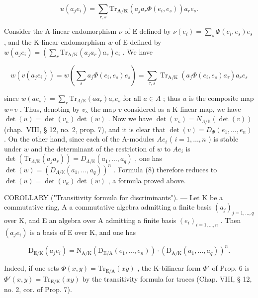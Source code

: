 \[
u (a _ {j} e _ {i}) = \sum_ {r, s} \mathrm{Tr} _ {\mathbf {A} / \mathbf {K}} (a _ {j} a _ {r} \Phi (e _ {i}, e _ {s})) a _ {r} e _ {s}.
\]

Consider the A-linear endomorphism \(\nu\) of E defined by \(\nu(e_i) = \sum_s \Phi(e_i, e_s)e_s\) , and the K-linear endomorphism \(w\) of E defined by \(w(a_j e_i) = (\sum_r \mathrm{Tr}_{\mathrm{A/K}}(a_j a_r)a_r)e_i\) . We have

\[
w \left(v \left(a _ {j} e _ {i}\right)\right) = w \left(\sum_ {s} a _ {j} \Phi \left(e _ {i}, e _ {s}\right) e _ {s}\right) = \sum_ {\tau , s} \operatorname{Tr} _ {\mathrm{A} / \mathrm{K}} \left(a _ {j} \Phi \left(e _ {i}, e _ {s}\right) a _ {\tau}\right) a _ {r} e _ {s}
\]

since \(w(ae_s) = \sum_r \mathrm{Tr}_{\Lambda/\mathbb{K}}(aa_r)a_r e_s\) for all \(a \in A\) ; thus \(u\) is the composite map \(w \circ v\) . Thus, denoting by \(v_{\kappa}\) the map \(v\) considered as a K-linear map, we have \(\det(u) = \det(v_{\kappa})\det(w)\) . Now we have \(\det(v_{\kappa}) = N_{\Lambda/\mathbb{K}}(\det(v))\) (chap.~VIII, § 12, no. 2, prop. 7), and it is clear that \(\det(v) = D_{\Phi}(e_1, \ldots, e_n)\) . On the other hand, since each of the A-modules \(Ae_i\) ( \(i = 1, \ldots, n\) ) is stable under \(w\) and the determinant of the restriction of \(w\) to \(Ae_i\) is \(\det(\mathrm{Tr}_{\Lambda/\mathbb{K}}(a_j a_r)) = D_{\Lambda/\mathbb{K}}(a_1, \ldots, a_q)\) , one has \(\det(w) = (D_{\Lambda/\mathbb{K}}(a_1, \ldots, a_q))^n\) . Formula (8) therefore reduces to \(\det(u) = \det(v_{\kappa})\det(w)\) , a formula proved above.

COROLLARY ("Transitivity formula for discriminants"). — Let K be a commutative ring, A a commutative algebra admitting a finite basis \((a_{j})_{j=1,\ldots,q}\) over K, and E an algebra over A admitting a finite basis \((e_{i})_{i=1,\ldots,n}\) . Then \((a_{j}e_{i})\) is a basis of E over K, and one has

\[
\mathrm{D} _ {\mathrm{E} / \mathrm{K}} (a _ {j} e _ {i}) = \mathrm{N} _ {\mathrm{A} / \mathrm{K}} (\mathrm{D} _ {\mathrm{E} / \mathrm{A}} (e _ {1}, \dots , e _ {n})) \cdot (\mathrm{D} _ {\mathrm{A} / \mathrm{K}} (a _ {1}, \dots , a _ {q})) ^ {n}.
\]

Indeed, if one sets \(\Phi(x,y)=\mathrm{Tr}_{\mathrm{E/A}}(xy)\) , the K-bilinear form \(\Phi'\) of Prop. 6 is \(\Phi'(x,y)=\mathrm{Tr}_{\mathrm{E/K}}(xy)\) by the transitivity formula for traces (Chap. VIII, § 12, no. 2, cor. of Prop. 7).

